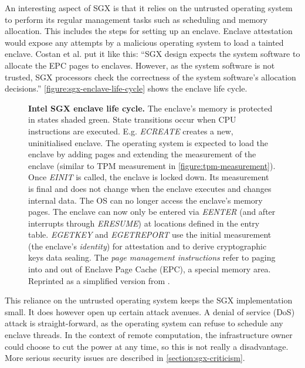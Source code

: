An interesting aspect of SGX is that it relies on the untrusted operating system to perform its regular management tasks such as scheduling and memory allocation.\label{ID_96634994}
This includes the steps for setting up an enclave.\label{ID_307359552}
Enclave attestation would expose any attempts by a malicious operating system to load a tainted enclave.\label{ID_483221956}
Costan et al. put it like this: ``SGX design expects the system software to allocate the EPC pages to enclaves. However, as the system software is not trusted, SGX processors check the correctness of the system software’s allocation decisions.'' \cite[]{sgx-explained}\label{ID_729915388}
\autoref{figure:sgx-enclave-life-cycle} shows the enclave life cycle.\label{ID_1080928863}
\begin{figure}[htbp]
\makebox[\textwidth][c]{
}\caption{\textbf{Intel SGX enclave life cycle.}\label{ID_1610889698}
The enclave's memory is protected in states shaded green.\label{ID_1686831062}
State transitions occur when CPU instructions are executed. E.g. \textit{ECREATE} creates a new, uninitialised enclave.\label{ID_805562591}
The operating system is expected to load the enclave by adding pages and extending the measurement of the enclave (similar to TPM measurement in \autoref{figure:tpm-measurement}).\label{ID_244657479}
Once \textit{EINIT} is called, the enclave is locked down. Its measurement is final and does not change when the enclave executes and changes internal data. The OS can no longer access the enclave's memory pages.\label{ID_1399476685}
The enclave can now only be entered via \textit{EENTER} (and after interrupts through \textit{ERESUME}) at locations defined in the entry table.\label{ID_98268923}
\textit{EGETKEY} and \textit{EGETREPORT} use the initial measurement (the enclave's \textit{identity}) for attestation and to derive cryptographic keys data sealing.\label{ID_1969992855}
The \textit{page management instructions} refer to paging into and out of Enclave Page Cache (EPC), a special memory area.\label{ID_1496257738}
Reprinted as a simplified version from \cite{sgx-explained}.\label{ID_1060342788}
\label{ID_538890645}\label{figure:sgx-enclave-life-cycle}}
\end{figure}

This reliance on the untrusted operating system keeps the SGX implementation small. It does however open up certain attack avenues. A denial of service (DoS) attack is straight-forward, as the operating system can refuse to schedule any enclave threads. In the context of remote computation, the infrastructure owner could choose to cut the power at any time, so this is not really a disadvantage.\label{ID_1767974666}
More serious security issues are described in \autoref{section:sgx-criticism}.\label{ID_1234909125}

